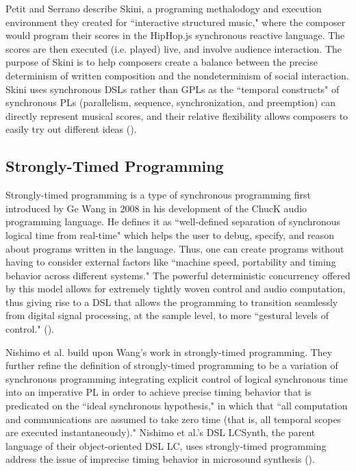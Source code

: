 \documentclass{report}
\newcommand\citeparen[1]{(\cite{#1})}
\begin{document}
Petit and Serrano describe Skini, a programing methalodogy and execution environment  they created  for ``interactive structured music," where the composer would  program their scores in the HipHop.js synchronous reactive  language. The scores are then executed (i.e.  played) live, and  involve audience interaction. The purpose of Skini is to help composers create  a balance  between the  precise determinism of written composition and the nondeterminism of social interaction. Skini uses synchronous DSLs rather than GPLs as the ``temporal constructs" of synchronous PLs (parallelism, sequence, synchronization, and preemption) can directly represent musical scores, and their relative flexibility allows  composers to easily try  out different ideas \citeparen{petit_serrano_2020}.

\subsection{Strongly-Timed Programming}
Strongly-timed programming is a type of synchronous programming first introduced by Ge Wang in 2008 in his development of the ChucK audio programming language. He defines it as ``well-defined separation of synchronous logical time from real-time" which helps the user to debug, specify, and reason about programs  written in the language. Thus, one can create  programs without having to consider external  factors like ``machine speed, portability and timing behavior across different systems." The powerful deterministic  concurrency offered by this  model allows for extremely tightly woven control and audio computation, thus giving rise to a DSL that allows the programming to transition seamlessly from digital signal processing, at the sample level, to more ``gestural levels of control." \citeparen{wang_2008}.

Nishimo et al. build upon Wang's work in strongly-timed programming. They further refine the definition of strongly-timed programming to be a variation of synchronous programming  integrating explicit control of logical synchronous time into an imperative PL in order to achieve precise timing behavior that is predicated on the ``ideal synchronous hypothesis," in which  that ``all computation and communications are assumed to take zero time (that is, all temporal scopes are executed instantaneously)." Nishimo  et al.'s DSL LCSynth, the parent language of  their object-oriented DSL LC, uses strongly-timed programming address the issue of imprecise  timing behavior in microsound synthesis \citeparen{nishino_2012}.
\end{document}
